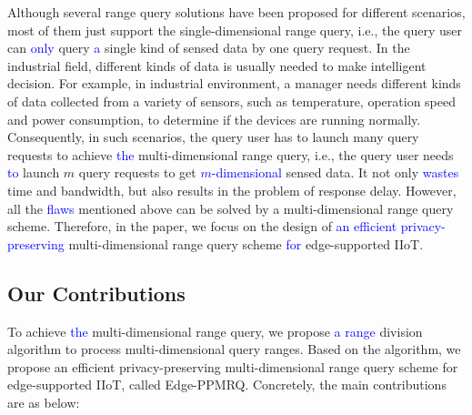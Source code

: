 \documentclass[IEEE JOURNAL OF BIOMEDICAL AND HEALTH INFORMATICS]{IEEEtran}
\begin{document}
Although several range query solutions have been proposed for different scenarios, most of them just support the single-dimensional range query, i.e., the query user can \textcolor{blue}{only} query \textcolor{blue}{a} single kind of sensed data by one query request. In the industrial field, different kinds of data is usually needed to make intelligent decision. For example, in industrial environment, a manager needs different kinds of data collected from a variety of sensors, such as temperature, operation speed and power consumption, to determine if the devices are running normally. Consequently, in such scenarios, the query user has to launch many query requests to achieve \textcolor{blue}{the} multi-dimensional range query, i.e., the query user needs \textcolor{blue}{to} launch $m$ query requests to get \textcolor{blue}{$m$-dimensional} sensed data. It not only \textcolor{blue}{wastes} time and bandwidth, but also results in the problem of response delay. However, all the \textcolor{blue}{flaws} mentioned above can be solved by a multi-dimensional range query scheme. Therefore, in the paper, we focus on the design of \textcolor{blue}{an efficient privacy-preserving} multi-dimensional range query scheme \textcolor{blue}{for} edge-supported IIoT.


\subsection{Our Contributions}
To achieve \textcolor{blue}{the} multi-dimensional range query, we propose \textcolor{blue}{a} \textcolor{blue}{range} division algorithm to process multi-dimensional query ranges. Based on the algorithm, we propose an efficient privacy-preserving multi-dimensional range query scheme for edge-supported IIoT, called Edge-PPMRQ. Concretely, the main contributions are as below:
\end{document}
